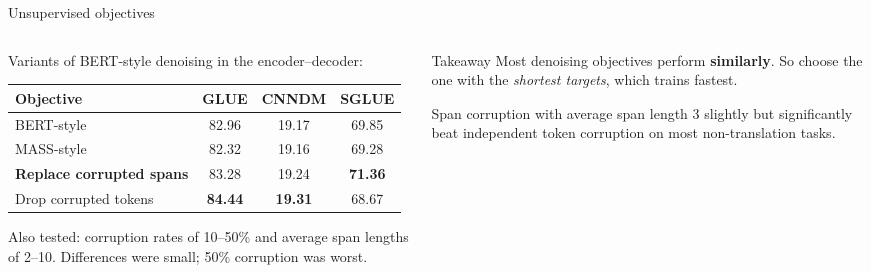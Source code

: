 \documentclass[aspectratio=169,11pt]{beamer}
\begin{document}
\begin{frame}{Unsupervised objectives}
  \begin{columns}[T]
    \begin{column}{0.56\textwidth}
      \footnotesize
      Variants of BERT-style denoising in the encoder--decoder:
      \vspace{1mm}

      \begin{tabular}{@{}lccc@{}}
        \toprule
        Objective & GLUE & CNNDM & SGLUE\\
        \midrule
        BERT-style & 82.96 & 19.17 & 69.85\\
        MASS-style & 82.32 & 19.16 & 69.28\\
        \textbf{Replace corrupted spans} & 83.28 & 19.24 & \textbf{71.36}\\
        Drop corrupted tokens & \textbf{84.44} & \textbf{19.31} & 68.67\\
        \bottomrule
      \end{tabular}
      \vspace{2mm}

      \small
      Also tested: corruption rates of 10--50\% and average span lengths of 2--10. Differences were small; 50\% corruption was worst.
    \end{column}
    \begin{column}{0.4\textwidth}
      \begin{exampleblock}{Takeaway}
        \small
        Most denoising objectives perform \textbf{similarly}. So choose the one with the \emph{shortest targets}, which trains fastest.
        \vspace{1mm}

        Span corruption with average span length 3 slightly but significantly beat independent token corruption on most non-translation tasks.
      \end{exampleblock}
    \end{column}
  \end{columns}
\end{frame}
\end{document}
